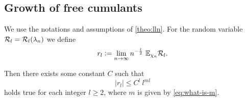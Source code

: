 \documentclass[12pt,usenames,dvipsnames,svgnames,table]{amsart}
\begin{document}
\subsection{Growth of free cumulants}
\begin{proposition}
	\label{prop:CumulantsGrowSlow}
	We use the notations and assumptions of \cref{theo:lln}.
	For the random variable $\mathcal{R}_l=\mathcal{R}_l(\lambda_n)$ we define
	\begin{equation}
	\label{eq:free-cumulants-exist}
	r_l := \lim_{n\to\infty} {n^{- \frac{l}{2}}}\  \mathbb{E}_{\chi_n} \mathcal{R}_l.   
	\end{equation}
	
	Then there exists some constant $C$ such that
	\begin{equation}
	\label{eq:free-cumulants-grow-slow}
	|r_l| \leq C^{l}\ l^{ml}    
	\end{equation}
	holds true for each integer $l\geq 2$, where
	$m$ is given by \eqref{eq:what-is-m}.
\end{proposition}
\end{document}
